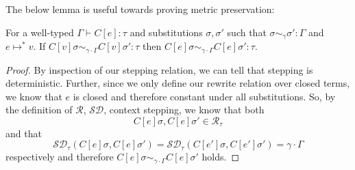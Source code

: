The below lemma is useful towards proving metric preservation:
\begin{lemma}
  \label{thm:ctx-stepping}
  For a well-typed $\Gamma \vdash C[e] : \tau$ and substitutions $\sigma,
  \sigma'$ such that $\sigma \sim_{\gamma} \sigma' : \Gamma$ and
  $e \mapsto^{*} v$.
  If $C[v] \sigma \sim_{\gamma \cdot \Gamma} C[v] \sigma' : \tau$ then
  $C[e] \sigma \sim_{\gamma \cdot \Gamma} C [e] \sigma' : \tau$.
\end{lemma}
\begin{proof}
  By inspection of our stepping relation, we can tell that stepping is
  deterministic. Further, since we only define our rewrite relation over closed
  terms, we know that $e$ is closed and therefore constant under all
  substitutions. 
  So, by the definition of $\mathcal{R}$, $\mathcal{SD}$, 
  context stepping, we know that both 
  $$C[e] \sigma, C[e] \sigma' \in \mathcal{R}_{\tau}$$ 
  and that 
  $$\mathcal{SD}_{\tau}(C[e]\sigma, C[e]\sigma') = \mathcal{SD}_{\tau}(C[e']\sigma, C[e']\sigma') = \gamma \cdot \Gamma$$
  respectively and therefore $C[e] \sigma \sim_{\gamma \cdot \Gamma} C[e]
  \sigma'$ holds.
\end{proof}

